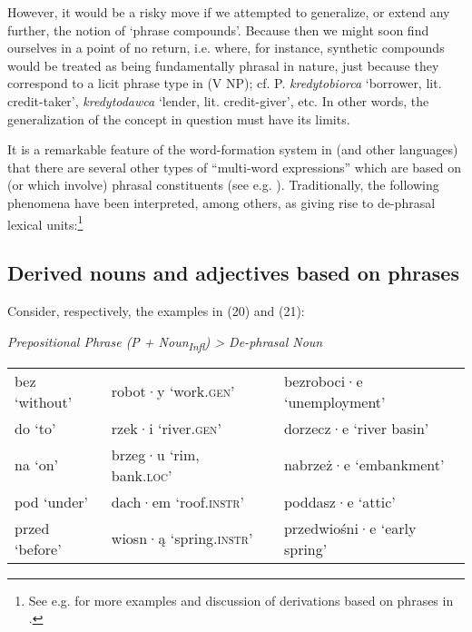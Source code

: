 \documentclass[output=paper]{LSP/langsci}
\begin{document}
{However, it would be a risky move if we attempted to generalize, or extend any further, the notion of ‘phrase compounds’. Because then we might soon find ourselves in a point of no return, i.e. where, for instance, synthetic compounds would be treated as being fundamentally phrasal in nature, just because they correspond to a licit phrase type in  (V NP); cf. P.} {\textit{kredytobiorca}} {‘borrower, lit. credit-taker’,} {\textit{kredytodawca}} {‘lender, lit. credit-giver’, etc. In other words, the generalization of the concept in question must have its limits.}

{It is a remarkable feature of the word-formation system in  (and other  languages) that there are several other types of “multi-word expressions” which are based on (or which involve) phrasal constituents (see e.g. \citealt{Martincová2015,Ohnheiser2015}). Traditionally, the following phenomena have been interpreted, among others, as giving rise to de-phrasal lexical units:}\footnote{{See e.g. \citet[237]{Szymanek2010} for more examples and discussion of derivations based on phrases in .}}

\subsection*{Derived nouns and adjectives based on phrases} 

Consider, respectively, the examples in (20) and (21):

\ea\label{ex:szymanek:19} 
{\textit{Prepositional Phrase (P + Noun}}{\textit{\textsubscript{Infl}}}{\textit{)  >  De-phrasal Noun}}\\

\begin{tabular}{llll}
bez ‘without’ &  robot·y ‘work.{\textsc{gen}}’ &&   bezroboci·e ‘unemployment’    \\
do ‘to’     &    rzek·i ‘river.{\textsc{gen}}’ &&     dorzecz·e ‘river basin’     \\
na ‘on’  &  brzeg·u ‘rim, bank.{\textsc{loc}}’  &&  nabrzeż·e ‘embankment’        \\
pod ‘under’   &  dach·em ‘roof.{\textsc{instr}}’ &&   poddasz·e ‘attic’           \\
przed ‘before’& wiosn·ą ‘spring.{\textsc{instr}}’  &&  przedwiośni·e ‘early spring’\\
\end{tabular}
\z 
\end{document}
